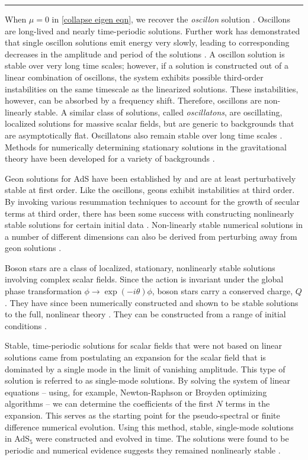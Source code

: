 \documentclass[../PhD.tex]{subfiles}
\begin{document}
\rule{\textwidth}{1pt}

When $\mu = 0$ in \eqref{collapse eigen eqn}, we recover the \emph{oscillon} solution \cite{1701.09100}. Oscillons are long-lived and nearly time-periodic solutions. Further work has demonstrated that single oscillon solutions emit energy very slowly, leading to corresponding decreases in the amplitude and period of the solutions \cite{hep-ph/9503217}. A oscillon solution is stable over very long time scales; however, if a solution is constructed out of a linear combination of oscillons, the system exhibits possible third-order instabilities on the same timescale as the linearized solutions. These instabilities, however, can be absorbed by a frequency shift. Therefore, oscillons are non-linearly stable. A similar class of solutions, called \emph{oscillatons}, are oscillating, localized solutions for massive scalar fields, but are generic to backgrounds that are asymptotically flat. Oscillatons also remain stable over long time scales \cite{gr-qc/0310006}. Methods for numerically determining stationary solutions in the gravitational theory have been developed for a variety of backgrounds \cite{1510.02804}.

 Geon solutions for AdS have been established by and are at least perturbatively stable at first order. Like the oscillons, geons exhibit instabilities at third order. By invoking various resummation techniques to account for the growth of secular terms at third order, there has been some success with constructing nonlinearly stable solutions for certain initial data \cite{1701.07804}. Non-linearly stable numerical solutions in a number of different dimensions can also be derived from perturbing away from geon solutions \cite{1503.07746}. 

Boson stars are a class of localized, stationary, nonlinearly stable solutions involving complex scalar fields. Since the \ads action is invariant under the global phase transformation $\phi \to \exp(-i \theta) \phi$, boson stars carry a conserved charge, $Q$. They have since been numerically constructed and shown to be stable solutions to the full, nonlinear theory \cite{1304.4166}. They can be constructed from a range of initial conditions \cite{1209.2378, 1301.2452}. 

Stable, time-periodic solutions for scalar fields that were not based on linear solutions came from postulating an expansion for the scalar field that is dominated by a single mode in the limit of vanishing amplitude. This type of solution is referred to as single-mode solutions. By solving the system of linear equations -- using, for example, Newton-Raphson or Broyden optimizing algorithms -- we can determine the coefficients of the first $N$ terms in the expansion. This serves as the starting point for the pseudo-spectral or finite difference numerical evolution. Using this method, stable, single-mode solutions in AdS$_5$ were constructed and evolved in time. The solutions were found to be periodic and numerical evidence suggests they remained nonlinearly stable \cite{1303.3186}.
\end{document}
